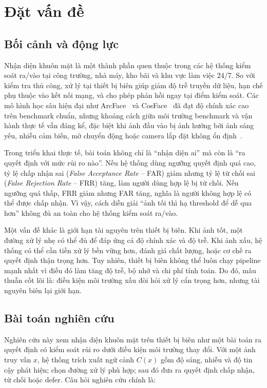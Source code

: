 \section{Đặt vấn đề}

\subsection{Bối cảnh và động lực}

Nhận diện khuôn mặt là một thành phần quen thuộc trong các hệ thống kiểm soát ra/vào tại công trường, nhà máy, kho bãi và khu vực làm việc 24/7. So với kiểm tra thủ công, xử lý tại thiết bị biên giúp giảm độ trễ truyền dữ liệu, hạn chế phụ thuộc vào kết nối mạng, và cho phép phản hồi ngay tại điểm kiểm soát. Các mô hình học sâu hiện đại như ArcFace~\cite{deng2019arcface} và CosFace~\cite{wang2018cosface} đã đạt độ chính xác cao trên benchmark chuẩn, nhưng khoảng cách giữa môi trường benchmark và vận hành thực tế vẫn đáng kể, đặc biệt khi ảnh đầu vào bị ảnh hưởng bởi ánh sáng yếu, nhiễu cảm biến, mờ chuyển động hoặc camera lắp đặt không ổn định~\cite{grother2019face}.

Trong triển khai thực tế, bài toán không chỉ là ``nhận diện ai'' mà còn là ``ra quyết định với mức rủi ro nào''. Nếu hệ thống dùng ngưỡng quyết định quá cao, tỷ lệ chấp nhận sai (\textit{False Acceptance Rate} -- FAR) giảm nhưng tỷ lệ từ chối sai (\textit{False Rejection Rate} -- FRR) tăng, làm người dùng hợp lệ bị từ chối. Nếu ngưỡng quá thấp, FRR giảm nhưng FAR tăng, nghĩa là người không hợp lệ có thể được chấp nhận. Vì vậy, cách diễn giải ``ảnh tối thì hạ threshold để dễ qua hơn'' không đủ an toàn cho hệ thống kiểm soát ra/vào.

Một vấn đề khác là giới hạn tài nguyên trên thiết bị biên. Khi ảnh tốt, một đường xử lý nhẹ có thể đủ để đáp ứng cả độ chính xác và độ trễ. Khi ảnh xấu, hệ thống có thể cần tiền xử lý bền vững hơn, đánh giá chất lượng, hoặc cơ chế ra quyết định thận trọng hơn. Tuy nhiên, thiết bị biên không thể luôn chạy pipeline mạnh nhất vì điều đó làm tăng độ trễ, bộ nhớ và chi phí tính toán. Do đó, mâu thuẫn cốt lõi là: điều kiện môi trường xấu đòi hỏi xử lý cẩn trọng hơn, nhưng tài nguyên biên lại giới hạn.

\subsection{Bài toán nghiên cứu}

Nghiên cứu này xem nhận diện khuôn mặt trên thiết bị biên như một bài toán ra quyết định có kiểm soát rủi ro dưới điều kiện môi trường thay đổi. Với một ảnh truy vấn $x$, hệ thống trích xuất ngữ cảnh $C(x)$ gồm độ sáng, nhiễu và độ tin cậy phát hiện; chọn đường xử lý phù hợp; sau đó đưa ra quyết định chấp nhận, từ chối hoặc defer. Câu hỏi nghiên cứu chính là:


